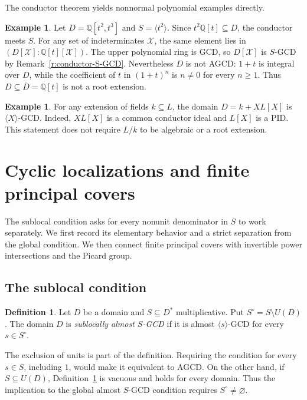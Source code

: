 \documentclass[11pt]{amsart}
\theoremstyle{definition}
\newtheorem{definition}[theorem]{Definition}
\newtheorem{example}[theorem]{Example}
\theoremstyle{remark}
\newcommand{\QQ}{\mathbb Q}
\begin{document}
The conductor theorem yields nonnormal polynomial examples directly.

\begin{example}\label{e:cusp-conductor}
Let $D=\QQ[t^2,t^3]$ and $S=\langle t^2\rangle$.
Since $t^2\QQ[t]\subseteq D$, the conductor meets $S$.
For any set of indeterminates $\mathcal X$, the same element
lies in $(D[\mathcal X]:\QQ[t][\mathcal X])$.
The upper polynomial ring is GCD, so
$D[\mathcal X]$ is $S$-GCD by
Remark~\ref{r:conductor-S-GCD}.
Nevertheless $D$ is not AGCD:
$1+t$ is integral over $D$, while the coefficient of $t$ in
$(1+t)^n$ is $n\ne0$ for every $n\geq1$. Thus
$D\subseteq\overline D=\QQ[t]$ is not a root extension.
\end{example}

\begin{example}\label{e:field-pullback}
For any extension of fields $k\subseteq L$, the domain
$D=k+XL[X]$ is $\langle X\rangle$-GCD.
Indeed, $XL[X]$ is a common conductor ideal and $L[X]$ is a PID.
This statement does not require $L/k$ to be algebraic or a root
extension.
\end{example}

\section{Cyclic localizations and finite principal covers}\label{sec:sublocal}

The sublocal condition asks for every nonunit denominator in $S$
to work separately. We first record its elementary behavior and a
strict separation from the global condition. We then connect finite
principal covers with invertible power intersections and the Picard
group.

\subsection{The sublocal condition}

\begin{definition}\label{d:sublocal-almost-S-GCD}
Let $D$ be a domain and $S\subseteq D^\ast$ multiplicative.
Put $S^\circ=S\setminus U(D)$. The domain $D$ is
\emph{sublocally almost $S$-GCD} if it is almost
$\langle s\rangle$-GCD for every $s\in S^\circ$.
\end{definition}

The exclusion of units is part of the definition. Requiring the
condition for every $s\in S$, including $1$, would make it
equivalent to AGCD. On the other hand, if $S\subseteq U(D)$,
Definition~\ref{d:sublocal-almost-S-GCD} is vacuous and holds for
every domain. Thus the implication to the global almost
$S$-GCD condition requires $S^\circ\ne\varnothing$.
\end{document}
